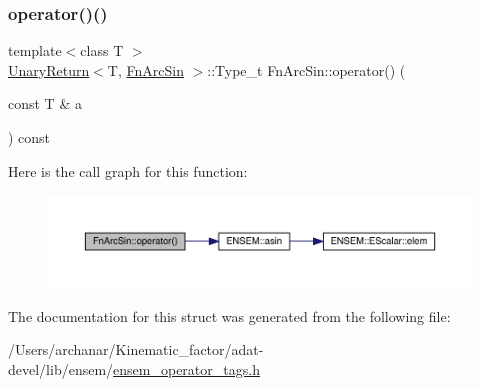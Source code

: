 \subsubsection{\texorpdfstring{operator()()}{operator()()}\hspace{0.1cm}{\footnotesize\ttfamily [3/3]}}
{\footnotesize\ttfamily template$<$class T $>$ \\
\mbox{\hyperlink{structUnaryReturn}{Unary\+Return}}$<$T, \mbox{\hyperlink{structFnArcSin}{Fn\+Arc\+Sin}} $>$\+::Type\+\_\+t Fn\+Arc\+Sin\+::operator() (\begin{DoxyParamCaption}\item[{const T \&}]{a }\end{DoxyParamCaption}) const\hspace{0.3cm}{\ttfamily [inline]}}

Here is the call graph for this function\+:
\nopagebreak
\begin{figure}[H]
\begin{center}
\leavevmode
\includegraphics[width=350pt]{d3/d85/structFnArcSin_a12cc5b8e1ae14e2bdb4a9ec3be431874_cgraph}
\end{center}
\end{figure}


The documentation for this struct was generated from the following file\+:\begin{DoxyCompactItemize}
\item 
/\+Users/archanar/\+Kinematic\+\_\+factor/adat-\/devel/lib/ensem/\mbox{\hyperlink{adat-devel_2lib_2ensem_2ensem__operator__tags_8h}{ensem\+\_\+operator\+\_\+tags.\+h}}\end{DoxyCompactItemize}
